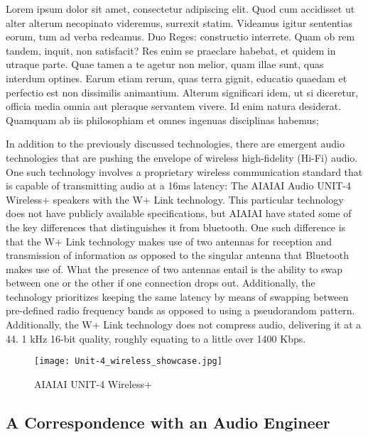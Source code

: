 \documentclass[conference]{IEEEtran}
\begin{document}
Lorem ipsum dolor sit amet, consectetur adipiscing elit. Quod cum accidisset ut alter alterum
necopinato videremus, surrexit statim. Videamus igitur sententias eorum, tum ad verba
redeamus. Duo Reges: constructio interrete. Quam ob rem tandem, inquit, non satisfacit? Res
enim se praeclare habebat, et quidem in utraque parte. Quae tamen a te agetur non melior,
quam illae sunt, quas interdum optines. Earum etiam rerum, quas terra gignit, educatio
quaedam et perfectio est non dissimilis animantium. Alterum significari idem, ut si
diceretur, officia media omnia aut pleraque servantem vivere. Id enim natura desiderat.
Quamquam ab iis philosophiam et omnes ingenuas disciplinas habemus;

In addition to the previously discussed technologies, there are emergent audio technologies
that are pushing the envelope of wireless high-fidelity (Hi-Fi) audio. One such technology
involves a proprietary wireless communication standard that is capable of transmitting audio
at a 16ms latency: The AIAIAI Audio UNIT-4 Wireless+ speakers with the W+ Link technology.
This particular technology does not have publicly available specifications, but AIAIAI have
stated some of the key differences that distinguishes it from bluetooth. One such difference
is that the W+ Link technology makes use of two antennas for reception and transmission of
information as opposed to the singular antenna that Bluetooth makes use of. What the presence
of two antennas entail is the ability to swap between one or the other if one connection
drops out. Additionally, the technology prioritizes keeping the same latency by means of
swapping between pre-defined radio frequency bands as opposed to using a pseudorandom
pattern. Additionally, the W+ Link technology does not compress audio, delivering it at a 44.
1 kHz 16-bit quality, roughly equating to a little over 1400 Kbps.\cite{noauthor_unit-4_2023}

\begin{figure}[htbp]
    \centering
    \texttt{[image: Unit-4\_wireless\_showcase.jpg]}
    \caption{AIAIAI UNIT-4 Wireless+ \cite{noauthor_unit-4_2023}}
    \label{fig:unit-4_productPic}
\end{figure}

\subsection*{A Correspondence with an Audio Engineer}
\end{document}
